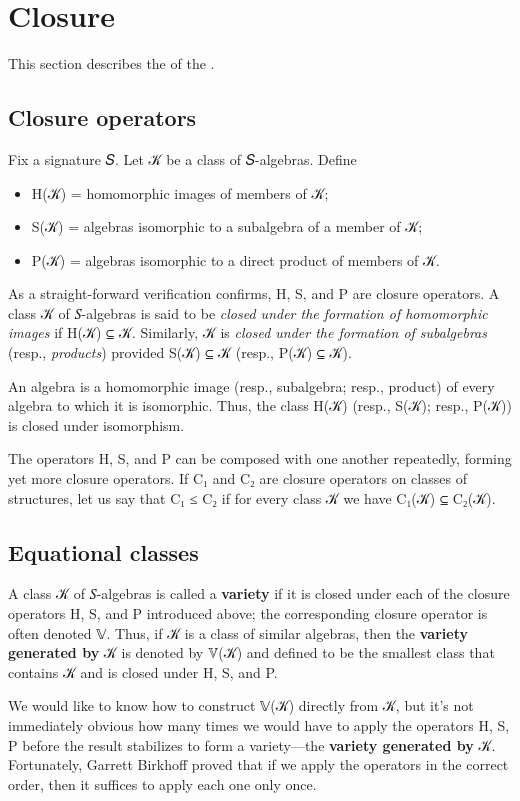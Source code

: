 \documentclass[a4paper,USenglish,cleveref,autoref,thm-restate]{lipics-v2019}
\begin{document}

\section{Closure}
This section describes the \closuremodule of the \agdaualib.

\subsection{Closure operators}\label{sec:closure-operators}
Fix a signature 𝑆. Let 𝒦 be a class of 𝑆-algebras. Define
\begin{itemize}
\item H(𝒦) = homomorphic images of members of 𝒦;
\item S(𝒦) = algebras isomorphic to a subalgebra of a member of 𝒦;
\item P(𝒦) = algebras isomorphic to a direct product of members of 𝒦.
\end{itemize}
As a straight-forward verification confirms, H, S, and P are closure operators. A class 𝒦 of 𝑆-algebras is said to be \emph{closed under the formation of homomorphic images} if H(𝒦) ⊆ 𝒦. Similarly, 𝒦 is \emph{closed under the formation of subalgebras} (resp., \emph{products}) provided S(𝒦) ⊆ 𝒦 (resp., P(𝒦) ⊆ 𝒦).

An algebra is a homomorphic image (resp., subalgebra; resp., product) of every algebra to which it is isomorphic. Thus, the class H(𝒦) (resp., S(𝒦); resp., P(𝒦)) is closed under isomorphism.

The operators H, S, and P can be composed with one another repeatedly, forming yet more closure operators. If C₁ and C₂ are closure operators on classes of structures, let us say that C₁ ≤ C₂ if for every class 𝒦 we have C₁(𝒦) ⊆ C₂(𝒦).

\subsection{Equational classes}\label{sec:equational-classes}
A class 𝒦 of 𝑆-algebras is called a \textbf{variety} if it is closed under each of the closure operators H, S, and P introduced above; the corresponding closure operator is often denoted 𝕍. Thus, if 𝒦 is a class of similar algebras, then the \textbf{variety generated by} 𝒦 is denoted by 𝕍(𝒦) and defined to be the smallest class that contains 𝒦 and is closed under H, S, and P.

We would like to know how to construct 𝕍(𝒦) directly from 𝒦, but it's not immediately obvious how many times we would have to apply the operators H, S, P before the result stabilizes to form a variety---the \textbf{variety generated by} 𝒦. Fortunately, Garrett Birkhoff proved that if we apply the operators in the correct order, then it suffices to apply each one only once.
\end{document}
